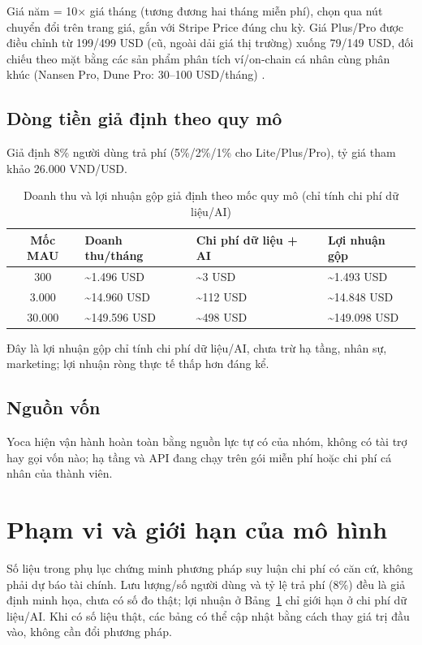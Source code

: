 Giá năm = 10× giá tháng (tương đương hai tháng miễn phí), chọn qua nút chuyển đổi trên trang giá, gắn với Stripe Price đúng chu kỳ. Giá Plus/Pro được điều chỉnh từ 199/499 USD (cũ, ngoài dải giá thị trường) xuống 79/149 USD, đối chiếu theo mặt bằng các sản phẩm phân tích ví/on-chain cá nhân cùng phân khúc (Nansen Pro, Dune Pro: 30--100 USD/tháng) \cite{nansenai, dune}.

\subsection{Dòng tiền giả định theo quy mô}

Giả định 8\% người dùng trả phí (5\%/2\%/1\% cho Lite/Plus/Pro), tỷ giá tham khảo 26.000 VND/USD.

\begin{table}[H]
\centering
\small
\caption{Doanh thu và lợi nhuận gộp giả định theo mốc quy mô (chỉ tính chi phí dữ liệu/AI)}
\label{tab:pnl-by-scale}
\begin{tabularx}{\textwidth}{|c|X|X|X|}
\hline
\textbf{Mốc MAU} & \textbf{Doanh thu/tháng} & \textbf{Chi phí dữ liệu + AI} & \textbf{Lợi nhuận gộp} \\
\hline
300 & \textasciitilde 1.496 USD & \textasciitilde 3 USD & \textasciitilde 1.493 USD \\
\hline
3.000 & \textasciitilde 14.960 USD & \textasciitilde 112 USD & \textasciitilde 14.848 USD \\
\hline
30.000 & \textasciitilde 149.596 USD & \textasciitilde 498 USD & \textasciitilde 149.098 USD \\
\hline
\end{tabularx}
\end{table}

Đây là lợi nhuận gộp chỉ tính chi phí dữ liệu/AI, chưa trừ hạ tầng, nhân sự, marketing; lợi nhuận ròng thực tế thấp hơn đáng kể.

\subsection{Nguồn vốn}

Yoca hiện vận hành hoàn toàn bằng nguồn lực tự có của nhóm, không có tài trợ hay gọi vốn nào; hạ tầng và API đang chạy trên gói miễn phí hoặc chi phí cá nhân của thành viên.

\section{Phạm vi và giới hạn của mô hình}

Số liệu trong phụ lục chứng minh phương pháp suy luận chi phí có căn cứ, không phải dự báo tài chính. Lưu lượng/số người dùng và tỷ lệ trả phí (8\%) đều là giả định minh họa, chưa có số đo thật; lợi nhuận ở Bảng~\ref{tab:pnl-by-scale} chỉ giới hạn ở chi phí dữ liệu/AI. Khi có số liệu thật, các bảng có thể cập nhật bằng cách thay giá trị đầu vào, không cần đổi phương pháp.

